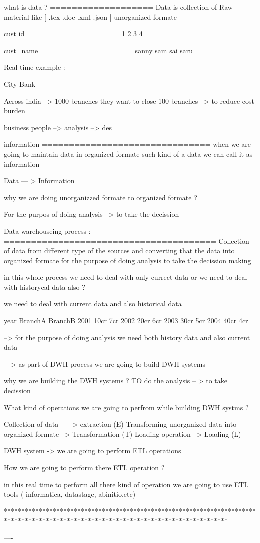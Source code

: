 what is data ?
===================
Data is collection of Raw material like [ .tex .doc .xml .json ] unorganized formate

cust id
=================
1
2
3
4

cust_name
=================
sanny
sam
sai
saru

Real time example :
------------------------------------------

City Bank

Across india --> 1000 branches
they want to close 100 branches --> to reduce cost burden

business people  --> analysis --> des




information 
===============================
when we are going to maintain data in organized formate such kind of a data we can call it as information 


Data --- > Information  

why we are doing unorganizzed formate to organized formate ?

For the purpos of doing analysis --> to take the decission 

Data warehouseing process :
=======================================
Collection of data from different type of the sources and converting that the data into organized formate for the purpose of doing analysis
 to take the decission making 


in this whole process we need to deal with only currect data or we need to deal with historycal data also ?

we need to deal with current data and also historical data

year BranchA BranchB
2001  10cr   7cr
2002  20cr   6cr
2003  30cr   5cr
2004  40cr   4cr

--> for the purpose of doing analysis we need both history data and also current data 

---> as part of DWH process we are going to build DWH systems

why we are building the DWH systems ?
TO do the analysis -- > to take decission 

What kind of operations we are going to perfrom while building DWH systms ?

Collection of data  ---- > extraction (E)
Transforming unorganized  data into organized formate --> Transformation (T)
Loading operation --> Loading (L)


DWH system -> we are going to perform ETL operations 

How we are going to perform there ETL operation ?

in this real time to perform all there kind of operation we are going to use ETL tools ( informatica, datastage, abinitio.etc)

****************************************************************************************************************************************


  
----


